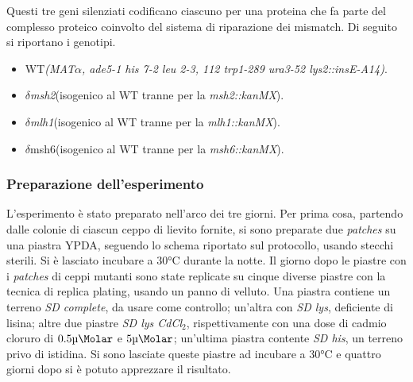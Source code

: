 	Questi tre geni silenziati codificano ciascuno per una proteina che fa parte del complesso proteico coinvolto del sistema di riparazione dei mismatch. 
	Di seguito si riportano i genotipi. 
	\begin{itemize}
		\item WT\emph{(MAT$\alpha$, ade5-1 his 7-2 leu 2-3, 112 trp1-289 ura3-52 lys2::insE-A14)}.
		\item \emph{$\delta$msh2}(isogenico al WT tranne per la \emph{msh2::kanMX}).
		\item \emph{$\delta$mlh1}(isogenico al WT tranne per la \emph{mlh1::kanMX}).
		\item \emph{$\delta$}msh6(isogenico al WT tranne per la \emph{msh6::kanMX}).
	\end{itemize}
 
 
	\subsubsection*{Preparazione dell'esperimento}
	L'esperimento \`e stato preparato nell'arco dei tre giorni. 
	Per prima cosa, partendo dalle colonie di ciascun ceppo di lievito fornite, si sono preparate due \emph{patches} su una piastra YPDA, seguendo lo schema riportato sul protocollo, usando stecchi sterili. 
	Si è lasciato incubare a $30\si{\celsius}$ durante la notte. 
	Il giorno dopo le piastre con i \emph{patches} di ceppi mutanti sono state replicate su cinque diverse piastre con la tecnica di replica plating, usando un panno di velluto. 
	Una piastra contiene un terreno \emph{SD complete}, da usare come controllo; un'altra con \emph{SD lys}, deficiente di lisina; altre due piastre \emph{SD lys CdCl$_{2}$}, rispettivamente con una dose di cadmio cloruro di $0.5\si{\micro\Molar}$ e $5\si{\micro\Molar}$; un'ultima piastra contente \emph{SD his}, un terreno privo di istidina. 
	Si sono lasciate queste piastre ad incubare a $30\si{\celsius}$ e quattro giorni dopo si è potuto apprezzare il risultato.
 
